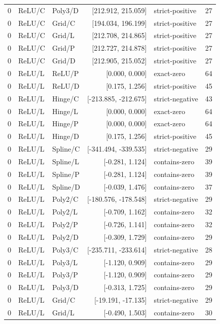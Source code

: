 \begin{longtable}{lllrlr}
0 & ReLU/C & Poly3/D & [212.912, 215.059] & strict-positive & 27 \\
0 & ReLU/C & Grid/C & [194.034, 196.199] & strict-positive & 27 \\
0 & ReLU/C & Grid/L & [212.708, 214.865] & strict-positive & 27 \\
0 & ReLU/C & Grid/P & [212.727, 214.878] & strict-positive & 27 \\
0 & ReLU/C & Grid/D & [212.905, 215.052] & strict-positive & 27 \\
0 & ReLU/L & ReLU/P & [0.000, 0.000] & exact-zero & 64 \\
0 & ReLU/L & ReLU/D & [0.175, 1.256] & strict-positive & 45 \\
0 & ReLU/L & Hinge/C & [-213.885, -212.675] & strict-negative & 43 \\
0 & ReLU/L & Hinge/L & [0.000, 0.000] & exact-zero & 64 \\
0 & ReLU/L & Hinge/P & [0.000, 0.000] & exact-zero & 64 \\
0 & ReLU/L & Hinge/D & [0.175, 1.256] & strict-positive & 45 \\
0 & ReLU/L & Spline/C & [-341.494, -339.535] & strict-negative & 29 \\
0 & ReLU/L & Spline/L & [-0.281, 1.124] & contains-zero & 39 \\
0 & ReLU/L & Spline/P & [-0.281, 1.124] & contains-zero & 39 \\
0 & ReLU/L & Spline/D & [-0.039, 1.476] & contains-zero & 37 \\
0 & ReLU/L & Poly2/C & [-180.576, -178.548] & strict-negative & 29 \\
0 & ReLU/L & Poly2/L & [-0.709, 1.162] & contains-zero & 32 \\
0 & ReLU/L & Poly2/P & [-0.726, 1.141] & contains-zero & 32 \\
0 & ReLU/L & Poly2/D & [-0.309, 1.729] & contains-zero & 29 \\
0 & ReLU/L & Poly3/C & [-235.711, -233.614] & strict-negative & 28 \\
0 & ReLU/L & Poly3/L & [-1.120, 0.909] & contains-zero & 29 \\
0 & ReLU/L & Poly3/P & [-1.120, 0.909] & contains-zero & 29 \\
0 & ReLU/L & Poly3/D & [-0.313, 1.725] & contains-zero & 29 \\
0 & ReLU/L & Grid/C & [-19.191, -17.135] & strict-negative & 29 \\
0 & ReLU/L & Grid/L & [-0.490, 1.503] & contains-zero & 30 \\

\end{longtable}
